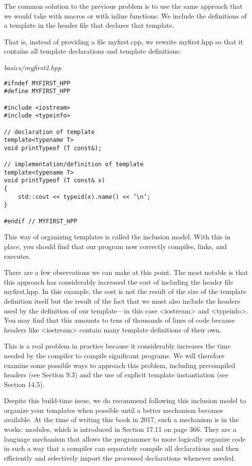 
The common solution to the previous problem is to use the same approach that we would take with macros or with inline functions: We include the definitions of a template in the header file that declares that template.

That is, instead of providing a file myfirst.cpp, we rewrite myfirst.hpp so that it contains all template declarations and template definitions:

\noindent
\textit{basics/myfirst2.hpp}
\begin{lstlisting}[style=styleCXX]
#ifndef MYFIRST_HPP
#define MYFIRST_HPP

#include <iostream>
#include <typeinfo>

// declaration of template
template<typename T>
void printTypeof (T const&);

// implementation/definition of template
template<typename T>
void printTypeof (T const& x)
{
	std::cout << typeid(x).name() << ’\n’;
}

#endif // MYFIRST_HPP
\end{lstlisting}

This way of organizing templates is called the inclusion model. With this in place, you should find that our program now correctly compiles, links, and executes.

There are a few observations we can make at this point. The most notable is that this approach has considerably increased the cost of including the header file myfirst.hpp. In this example, the cost is not the result of the size of the template definition itself but the result of the fact that we must also include the headers used by the definition of our template—in this case <iostream> and <typeinfo>. You may find that this amounts to tens of thousands of lines of code because headers like <iostream> contain many template definitions of their own.

This is a real problem in practice because it considerably increases the time needed by the compiler to compile significant programs. We will therefore examine some possible ways to approach this problem, including precompiled headers (see Section 9.3) and the use of explicit template instantiation (see Section 14.5).

Despite this build-time issue, we do recommend following this inclusion model to organize your templates when possible until a better mechanism becomes available. At the time of writing this book in 2017, such a mechanism is in the works: modules, which is introduced in Section 17.11 on page 366. They are a language mechanism that allows the programmer to more logically organize code in such a way that a compiler can separately compile all declarations and then efficiently and selectively import the processed declarations whenever needed.


